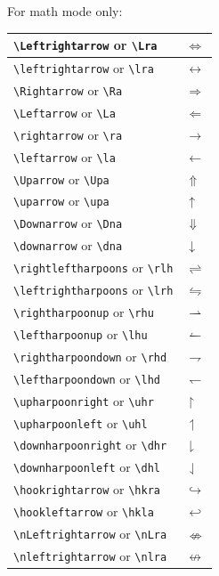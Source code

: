 \documentclass[a4paper,12pt]{article}
\begin{document}
For math mode only:
\begin{longtable}[c]{|p{}|p{}|}
\hline
\verb|\Leftrightarrow| or \verb|\Lra| & $\Leftrightarrow$ \\\hline
\verb|\leftrightarrow| or \verb|\lra| & $\leftrightarrow$ \\\hline
\verb|\Rightarrow| or \verb|\Ra| & $\Rightarrow$ \\\hline

\verb|\Leftarrow| or \verb|\La| & $\Leftarrow$ \\\hline
\verb|\rightarrow| or \verb|\ra| & $\rightarrow$ \\\hline
\verb|\leftarrow| or \verb|\la| & $\leftarrow$ \\\hline
\verb|\Uparrow| or \verb|\Upa| & $\Uparrow$ \\\hline
\verb|\uparrow| or \verb|\upa| & $\uparrow$ \\\hline
\verb|\Downarrow| or \verb|\Dna| & $\Downarrow$ \\\hline
\verb|\downarrow| or \verb|\dna| & $\downarrow$ \\\hline
\verb|\rightleftharpoons| or \verb|\rlh| & $\rightleftharpoons$ \\\hline
\verb|\leftrightharpoons| or \verb|\lrh| & $\leftrightharpoons$ \\\hline
\verb|\rightharpoonup| or \verb|\rhu| & $\rightharpoonup$ \\\hline
\verb|\leftharpoonup| or \verb|\lhu| & $\leftharpoonup$ \\\hline
\verb|\rightharpoondown| or \verb|\rhd| & $\rightharpoondown$ \\\hline
\verb|\leftharpoondown| or \verb|\lhd| & $\leftharpoondown$ \\\hline
\verb|\upharpoonright| or \verb|\uhr| & $\upharpoonright$ \\\hline
\verb|\upharpoonleft| or \verb|\uhl| & $\upharpoonleft$ \\\hline
\verb|\downharpoonright| or \verb|\dhr| & $\downharpoonright$ \\\hline
\verb|\downharpoonleft| or \verb|\dhl| & $\downharpoonleft$ \\\hline
\verb|\hookrightarrow| or \verb|\hkra| & $\hookrightarrow$ \\\hline
\verb|\hookleftarrow| or \verb|\hkla| & $\hookleftarrow$ \\\hline
\verb|\nLeftrightarrow| or \verb|\nLra| & $\nLeftrightarrow$ \\\hline
\verb|\nleftrightarrow| or \verb|\nlra| & $\nleftrightarrow$ \\\hline

\end{longtable}
\end{document}
